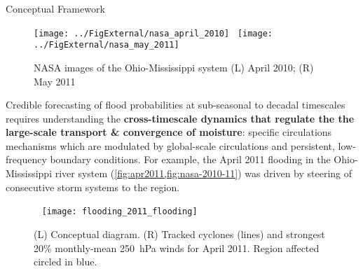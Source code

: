 \begin{block}{Conceptual Framework}
    \begin{figure}
        \caption{NASA images of the Ohio-Mississippi system (L) April 2010; (R) May 2011}
        \texttt{[image: ../FigExternal/nasa\_april\_2010]}~
        \texttt{[image: ../FigExternal/nasa\_may\_2011]}
        \label{fig:nasa-2010-11}
    \end{figure}
    Credible forecasting of flood probabilities at sub-seasonal to decadal timescales \cite{Merz2014} requires understanding the \textbf{cross-timescale dynamics that regulate the the large-scale transport \& convergence of moisture}: specific circulations mechanisms which are modulated by global-scale circulations and persistent, low-frequency boundary conditions.
    For example, the April 2011 flooding in the Ohio-Mississippi river system (\cref{fig:apr2011,fig:nasa-2010-11}) was driven by steering of consecutive storm systems to the region.
    \begin{figure}
        ~\hfill
        \texttt{[image: flooding\_2011\_flooding]}
        \caption{(L) Conceptual diagram. (R) Tracked cyclones (lines) and strongest 20\% monthly-mean \SI{250}{\hecto\pascal} winds for April 2011. Region affected circled in blue.}
        \label{fig:apr2011}
    \end{figure}
\end{block}
